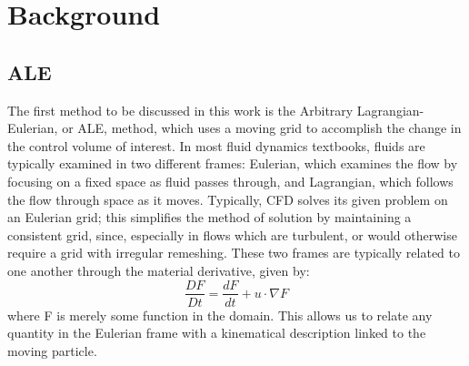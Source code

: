 \documentclass{article}
\def\deriv#1#2{\frac{d #1}{d #2}}
\begin{document}
 

\section{Background}

\subsection{ALE}

The first method to be discussed in this work is the Arbitrary Lagrangian-Eulerian, or ALE, method, which uses a moving grid to accomplish the change in the control volume of interest.  In most fluid dynamics textbooks, fluids are typically examined in two different frames: Eulerian, which examines the flow by focusing on a fixed space as fluid passes through, and Lagrangian, which follows the flow through space as it moves.  Typically, CFD solves its given problem on an Eulerian grid; this simplifies the method of solution by maintaining a consistent grid, since, especially in flows which are turbulent, or would otherwise require a grid with irregular remeshing.  These two frames are typically related to one another through the material derivative, given by:
\begin{equation}
  \frac{DF}{Dt} = \deriv{F}{t} + u \cdot \nabla F
\end{equation}
where F is merely some function in the domain.  This allows us to relate any quantity in the Eulerian frame with a kinematical description linked to the moving particle.  
\end{document}
